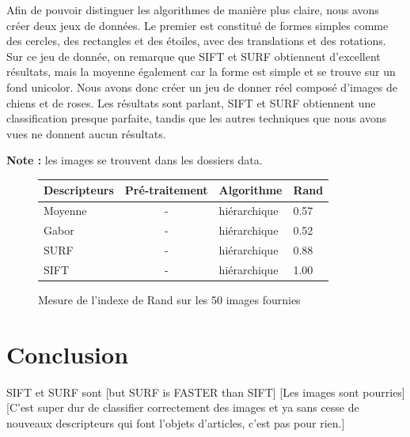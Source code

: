 \documentclass[12pt,a4paper,utf8x]{report}
\begin{document}
  Afin de pouvoir distinguer les algorithmes de manière plus claire, nous avons créer deux jeux de données. Le premier est constitué de formes simples comme des cercles, des rectangles et des étoiles, avec des translations et des rotations. Sur ce jeu de donnée, on remarque que SIFT et SURF obtiennent d'excellent résultats, mais la moyenne également car la forme est simple et se trouve sur un fond unicolor. Nous avons donc créer un jeu de donner réel composé d'images de chiens et de roses. Les résultats sont parlant, SIFT et SURF obtiennent une classification presque parfaite, tandis que les autres techniques que nous avons vues ne donnent aucun résultats.

  \textbf{Note : } les images se trouvent dans les dossiers data.

  \begin{figure}[!h]
      \centering
        \begin{tabular}{ | l | c | l | l |}
          \hline
          Descripteurs & Pré-traitement & Algorithme & Rand\\
          \hline
            Moyenne & -             & hiérarchique          & 0.57\\
            Gabor   & -             & hiérarchique          & 0.52\\
            SURF    & -             & hiérarchique          & 0.88\\
            SIFT    & -             & hiérarchique          & 1.00\\
          \hline  
        \end{tabular}
    \caption{Mesure de l'indexe de Rand sur les 50 images fournies}
  \end{figure}


\chapter{Conclusion}
    SIFT et SURF sont 
    [but SURF is FASTER than SIFT]
    [Les images sont pourries]
    [C'est super dur de classifier correctement des images et ya sans cesse de nouveaux descripteurs qui font l'objets d'articles, c'est pas pour rien.]

  
\end{document}
